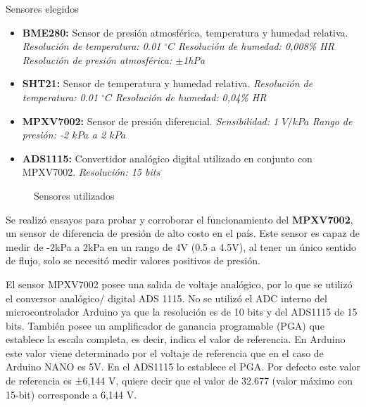 Sensores elegidos
\begin{itemize}
	\item  \textbf{BME280:} Sensor de presión atmosférica, temperatura y humedad relativa.
\subitem \textit{Resolución de temperatura: 0.01 $^{\circ}C$}
\subitem \textit{Resolución de humedad: 0,008\% HR}
\subitem \textit{Resolución de presión atmosférica: $\pm$1hPa}
	
	\item \textbf{SHT21:} Sensor de temperatura y humedad relativa.
\subitem \textit{Resolución de temperatura: 0.01 $^{\circ}C$}
\subitem \textit{Resolución de humedad: 0,04\% HR}	
	
	\item \textbf{MPXV7002:} Sensor de presión diferencial.
\subitem \textit{Sensibilidad: 1 $V/kPa$}
\subitem \textit{Rango de presión: -2 $kPa$ a 2 $kPa$}	
	
	\item \textbf{ADS1115:} Convertidor analógico digital utilizado en conjunto con MPXV7002.
\subitem \textit{Resolución: 15 bits}
\end{itemize}


\begin{figure}[htbp]
	\centering
	\caption{Sensores utilizados} \label{fig:senstodos}
\end{figure}




Se realizó ensayos para probar y corroborar el funcionamiento del \textbf{MPXV7002}, un sensor de diferencia de presión de alto costo en el país. Este sensor es capaz de medir de -2kPa a 2kPa en un rango de 4V (0.5 a 4.5V), al tener un único sentido de flujo, solo se necesitó medir valores positivos de presión.

El sensor MPXV7002 posee una salida de voltaje analógico, por lo que se utilizó el conversor analógico/ digital ADS 1115. 
No se utilizó el ADC interno del microcontrolador Arduino ya que la resolución es de 10 bits y del ADS1115 de 15 bits.
También posee un amplificador de ganancia programable (PGA) que establece la escala completa, es decir, indica el valor de referencia. En Arduino este valor viene determinado por el voltaje de referencia que en el caso de Arduino NANO es 5V. En el ADS1115 lo establece el PGA. Por defecto este valor de referencia es ±6,144 V, quiere decir que el valor de 32.677 (valor máximo con 15-bit) corresponde a 6,144 V. 

